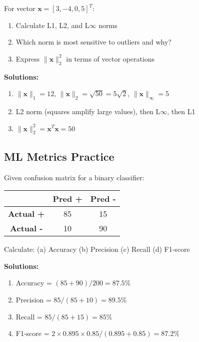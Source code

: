 \documentclass{article}
\providecommand{\vx}{\mathbf{x}}
\newcounter{exercise}
\begin{document}
\begin{tcolorbox}[colback=gray!5!white,colframe=gray!75!black,title=Exercise \stepcounter{exercise}\#\theexercise: Norm Calculations]
For vector $\vx = [3, -4, 0, 5]^T$:
\begin{enumerate}[label=(\alph*)]
	\item Calculate L1, L2, and L$\infty$ norms
	\item Which norm is most sensitive to outliers and why?
	\item Express $\|\vx\|_2^2$ in terms of vector operations
\end{enumerate}

\textbf{Solutions:}
\begin{enumerate}[label=(\alph*)]
	\item $\|\vx\|_1 = 12$, $\|\vx\|_2 = \sqrt{50} = 5\sqrt{2}$, $\|\vx\|_\infty = 5$
	\item L2 norm (squares amplify large values), then L$\infty$, then L1
	\item $\|\vx\|_2^2 = \vx^T\vx = 50$
\end{enumerate}
\end{tcolorbox}

\subsection{ML Metrics Practice}

\begin{tcolorbox}[colback=gray!5!white,colframe=gray!75!black,title=Exercise \stepcounter{exercise}\#\theexercise: Classification Metrics]
Given confusion matrix for a binary classifier:
\begin{center}
\begin{tabular}{|c|c|c|}
\hline
 & \textbf{Pred +} & \textbf{Pred -} \\
\hline
\textbf{Actual +} & 85 & 15 \\
\hline
\textbf{Actual -} & 10 & 90 \\
\hline
\end{tabular}
\end{center}
Calculate: (a) Accuracy (b) Precision (c) Recall (d) F1-score

\textbf{Solutions:}
\begin{enumerate}[label=(\alph*)]
	\item Accuracy = $(85+90)/200 = 87.5\%$
	\item Precision = $85/(85+10) = 89.5\%$
	\item Recall = $85/(85+15) = 85\%$
	\item F1-score = $2 \times 0.895 \times 0.85 / (0.895 + 0.85) = 87.2\%$
\end{enumerate}
\end{tcolorbox}
\end{document}
